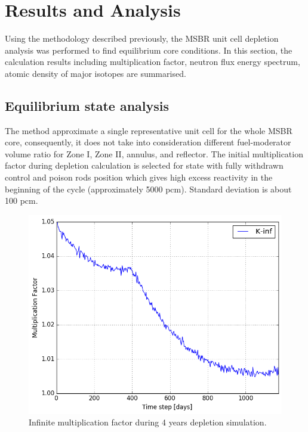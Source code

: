 \documentclass{anstrans}
\begin{document}
\section{Results and Analysis}

Using the methodology described previously, the \gls{MSBR} unit cell depletion 
analysis was performed to find equilibrium core conditions. In this section, 
the calculation results including multiplication factor, neutron flux energy 
spectrum, atomic density of major isotopes are summarised.

\subsection{Equilibrium state analysis}

The method approximate a single representative unit cell for the whole 
\gls{MSBR} core, consequently, it does not take into consideration different 
fuel-moderator volume ratio for Zone I, Zone II, annulus, and reflector. The 
initial multiplication factor during depletion calculation is selected for 
state with fully withdrawn control and poison rods position which gives high 
excess reactivity in the beginning of the cycle (approximately 5000 pcm). 
Standard deviation is about 100 pcm.

\begin{figure}[hb] %
        \centering
        \vspace{-0.8em}
        \includegraphics[width=1.03\linewidth]{keff.png}
        \caption{Infinite multiplication factor during 4 years depletion 
        simulation.}
        \vspace{-0.8em}
        \label{fig:keff}
\end{figure}
\end{document}
